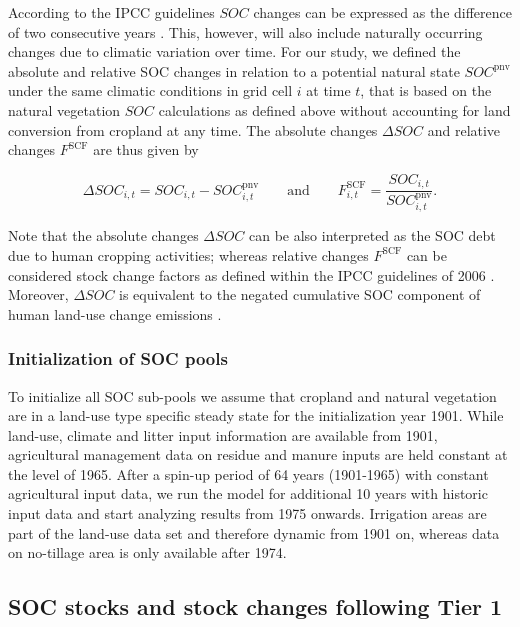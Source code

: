 \documentclass[gc, manuscript]{copernicus}
\begin{document}
According to the IPCC guidelines \(SOC\) changes can be expressed as the difference of two consecutive years \citep[see Eq. 5.0A in][]{calvo_buendia_ipcc_2019}. This, however, will also include naturally occurring changes due to climatic variation over time. For our study, we defined the absolute and relative SOC changes in relation to a potential natural state \(SOC^{\mathrm{pnv}}\) under the same climatic conditions in grid cell \(i\) at time \(t\), that is based on the natural vegetation \(SOC\) calculations as defined above without accounting for land conversion from cropland at any time. The absolute changes \(\Delta SOC\) and relative changes \(F^{\mathrm{SCF}}\) are thus given by

\begin{equation}
\Delta SOC_{i,t} = SOC_{i,t} - SOC^{\mathrm{pnv}}_{i,t}\qquad \text{and} \qquad  F^{\mathrm{SCF}}_{i,t} = \frac{SOC_{i,t}}{SOC^{\mathrm{pnv}}_{i,t}} .
\label{eq:stockdiff}
\end{equation}

Note that the absolute changes \(\Delta SOC\) can be also interpreted as the SOC debt \citep{sanderman_soil_2017} due to human cropping activities; whereas relative changes \(F^{\mathrm{SCF}}\) can be considered stock change factors as defined within the IPCC guidelines of 2006 \citep{eggleston_ipcc_2006}. Moreover, \(\Delta SOC\) is equivalent to the negated cumulative SOC component of human land-use change emissions \citep{pugh_simulated_2015}.

\hypertarget{sec:initsoc}{%
\subsubsection{Initialization of SOC pools}\label{sec:initsoc}}

To initialize all SOC sub-pools we assume that cropland and natural vegetation are in a land-use type specific steady state for the initialization year 1901. While land-use, climate and litter input information are available from 1901, agricultural management data on residue and manure inputs are held constant at the level of 1965. After a spin-up period of 64 years (1901-1965) with constant agricultural input data, we run the model for additional 10 years with historic input data and start analyzing results from 1975 onwards. Irrigation areas are part of the land-use data set and therefore dynamic from 1901 on, whereas data on no-tillage area is only available after 1974.

\hypertarget{sec:tier1}{%
\subsection{SOC stocks and stock changes following Tier 1}\label{sec:tier1}}
\end{document}

